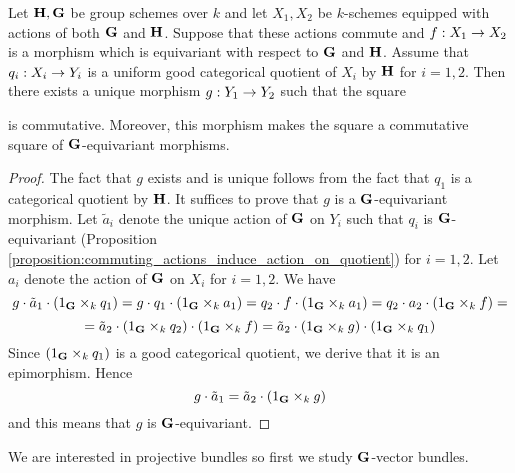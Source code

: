 \begin{proposition}\label{proposition:commuting_actions_induce_equivariant_quotient_of_morphism}
Let $\mathbf{H},\mathbf{G}$ be group schemes over $k$ and let $X_1,X_2$ be $k$-schemes equipped with actions of both $\mathbf{G}$ and $\mathbf{H}$. Suppose that these actions commute and $f:X_1\rightarrow X_2$ is a morphism which is equivariant with respect to $\mathbf{G}$ and $\mathbf{H}$. Assume that $q_i:X_i\rightarrow Y_i$ is a uniform good categorical quotient of $X_i$ by $\mathbf{H}$ for $i=1,2$. Then there exists a unique morphism $g:Y_1\rightarrow Y_2$ such that the square
\begin{center}
\end{center}
is commutative. Moreover, this morphism makes the square a commutative square of $\mathbf{G}$-equivariant morphisms.
\end{proposition}
\begin{proof}
The fact that $g$ exists and is unique follows from the fact that $q_1$ is a categorical quotient by $\mathbf{H}$. It suffices to prove that $g$ is a $\mathbf{G}$-equivariant morphism. Let $\tilde{a}_i$ denote the unique action of $\mathbf{G}$ on $Y_i$ such that $q_i$ is $\mathbf{G}$-equivariant (Proposition \ref{proposition:commuting_actions_induce_action_on_quotient}) for $i=1,2$. Let $a_i$ denote the action of $\mathbf{G}$ on $X_i$ for $i=1,2$. We have
$$g\cdot \tilde{a}_1 \cdot \left(1_{\mathbf{G}}\times_k q_1\right) = g\cdot q_1\cdot \left(1_{\mathbf{G}}\times_k a_1\right) = q_2\cdot f \cdot \left(1_{\mathbf{G}}\times_k a_1\right) = q_2\cdot a_2 \cdot \left(1_{\mathbf{G}}\times_kf\right) =$$
$$= \tilde{a}_2\cdot \left(1_{\mathbf{G}}\times_kq_2\right)\cdot \left(1_{\mathbf{G}}\times_k f\right) = \tilde{a}_2\cdot \left(1_{\mathbf{G}}\times_k g\right)\cdot \left(1_{\mathbf{G}}\times_k q_1\right)$$
Since $\left(1_{\mathbf{G}}\times_k q_1\right)$ is a good categorical quotient, we derive that it is an epimorphism. Hence
$$g\cdot \tilde{a}_1= \tilde{a}_2\cdot \left(1_{\mathbf{G}}\times_k g\right)$$
and this means that $g$ is $\mathbf{G}$-equivariant.
\end{proof}
\noindent
We are interested in projective bundles so first we study $\mathbf{G}$-vector bundles.

